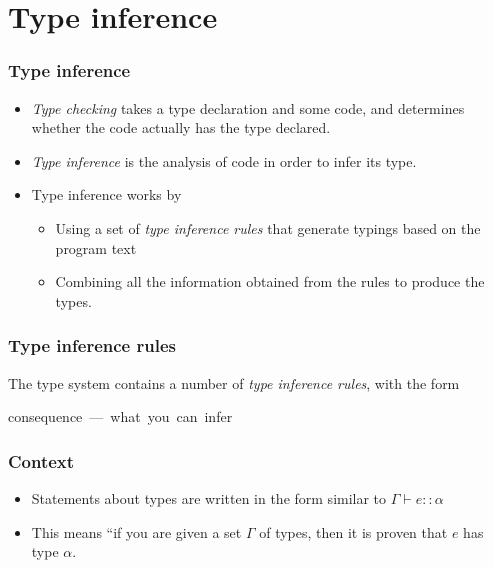 \documentclass{beamer}
\begin{document}
\section{Type inference}
\begin{frame}[fragile]
\frametitle{Type inference}

\begin{itemize}
\item \emph{Type checking} takes a type declaration and some code,
  and determines whether the code actually has the type declared.
\item \emph{Type inference} is the analysis of code in order to
  infer its type.
\item Type inference works by
  \begin{itemize}
  \item Using a set of \emph{type inference rules} that generate
    typings based on the program text
  \item Combining all the information obtained from the rules to
    produce the types.
  \end{itemize}
\end{itemize}

\end{frame}

\begin{frame}[fragile]
\frametitle{Type inference rules}

The type system contains a number of \emph{type inference rules},
with the form

  {\hbox{consequence --- what you can infer}}

\end{frame}

\begin{frame}[fragile]
\frametitle{Context}

\begin{itemize}
\item Statements about types are written in the form similar to
  $\Gamma \vdash e :: \alpha$
\item This means ``if you are given a set $\Gamma$ of types, then
  it is proven that $e$ has type $\alpha$.
\end{itemize}

\end{frame}
\end{document}
